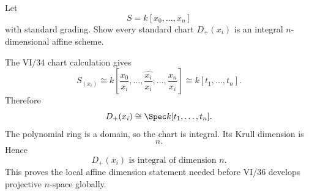 \begin{problem}\label{prob:vi35-19}
Let
\[
S=k[x_0,\ldots,x_n]
\]
with standard grading. Show every standard chart \(D_+(x_i)\) is an integral \(n\)-dimensional affine scheme.

\end{problem}

\ifdefined\FullProblemDossiers
\begin{solution}
The VI/34 chart calculation gives
\[
S_{(x_i)}
\cong
k\!\left[
\frac{x_0}{x_i},\ldots,
\widehat{\frac{x_i}{x_i}},
\ldots,\frac{x_n}{x_i}
\right]
\cong
k[t_1,\ldots,t_n].
\]
Therefore
\[
D_+(x_i)
\cong
\Spec k[t_1,\ldots,t_n].
\]
The polynomial ring is a domain, so the chart is integral. Its Krull dimension is
\[
n.
\]
Hence
\[
\boxed{D_+(x_i)\text{ is integral of dimension }n}.
\]
This proves the local affine dimension statement needed before VI/36 develops projective \(n\)-space globally.
\end{solution}
\fi
